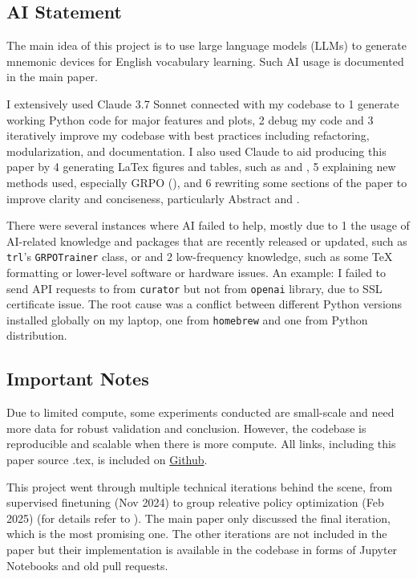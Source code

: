 \subsection*{AI Statement} \label{sec:ai-statement}

The main idea of this project is to use large language models (LLMs) to generate mnemonic devices for English vocabulary learning. Such AI usage is documented in the main paper.

I extensively used Claude 3.7 Sonnet connected with my codebase to \numlist{1} generate working Python code for major features and plots, \numlist{2} debug my code and \numlist{3} iteratively improve my codebase with best practices including refactoring, modularization, and documentation. I also used Claude to aid producing this paper by \numlist{4} generating LaTex figures and tables, such as  and , \numlist{5} explaining new methods used, especially GRPO (), and \numlist{6} rewriting some sections of the paper to improve clarity and conciseness, particularly Abstract and .

There were several instances where AI failed to help, mostly due to \numlist{1} the usage of AI-related knowledge and packages that are recently released or updated, such as \verb|trl|'s \verb|GRPOTrainer| class, or and \numlist{2} low-frequency knowledge, such as some TeX formatting or lower-level software or hardware issues. An example: I failed to send API requests to \teachermodel from \verb|curator| but not from \verb|openai| library, due to SSL certificate issue. The root cause was a conflict between different Python versions installed globally on my laptop, one from \verb|homebrew| and one from Python distribution.

\subsection*{Important Notes} \label{sec:important-notes}

Due to limited compute, some experiments conducted are small-scale and need more data for robust validation and conclusion. However, the codebase is reproducible and scalable when there is more compute. All links, including this paper source .tex, is included on \hyperlink{https://github.com/chiffonng/mnemonic-gen}{Github}.

This project went through multiple technical iterations behind the scene, from supervised finetuning (Nov 2024) to group releative policy optimization (Feb 2025) (for details refer to ). The main paper only discussed the final iteration, which is the most promising one. The other iterations are not included in the paper but their implementation is available in the codebase in forms of Jupyter Notebooks and old pull requests.

\clearpage

\tableofcontents
